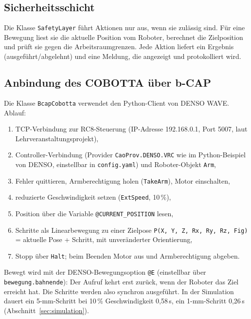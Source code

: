 \documentclass[11pt,a4paper]{article}
\newcommand{\datei}[1]{\texttt{#1}}
\begin{document}
\subsection{Sicherheitsschicht}

Die Klasse \texttt{SafetyLayer} führt Aktionen nur aus, wenn sie zulässig sind. Für eine
Bewegung liest sie die aktuelle Position vom Roboter, berechnet die Zielposition und prüft sie gegen
die Arbeitsraumgrenzen. Jede Aktion liefert ein Ergebnis (ausgeführt/abgelehnt) und eine Meldung,
die angezeigt und protokolliert wird.

\subsection{Anbindung des COBOTTA über b-CAP}

Die Klasse \texttt{BcapCobotta} verwendet den Python-Client von DENSO WAVE. Ablauf:
\begin{enumerate}
  \item TCP-Verbindung zur RC8-Steuerung (IP-Adresse 192.168.0.1, Port 5007, laut Lehrveranstaltungsprojekt),
  \item Controller-Verbindung (Provider \texttt{CaoProv.DENSO.VRC} wie im Python-Beispiel von DENSO,
        einstellbar in \datei{config.yaml}) und Roboter-Objekt \texttt{Arm},
  \item Fehler quittieren, Armberechtigung holen (\texttt{TakeArm}), Motor einschalten,
  \item reduzierte Geschwindigkeit setzen (\texttt{ExtSpeed}, 10\,\%),
  \item Position über die Variable \texttt{@CURRENT\_POSITION} lesen,
  \item Schritte als Linearbewegung zu einer Zielpose
        \texttt{P(X, Y, Z, Rx, Ry, Rz, Fig)} = aktuelle Pose + Schritt, mit unveränderter Orientierung,
  \item Stopp über \texttt{Halt}; beim Beenden Motor aus und Armberechtigung abgeben.
\end{enumerate}
Bewegt wird mit der DENSO-Bewegungsoption \texttt{@E} (einstellbar über \texttt{bewegung.bahnende}):
Der Aufruf kehrt erst zurück, wenn der Roboter das Ziel erreicht hat. Die Schritte werden also
synchron ausgeführt. In der Simulation dauert ein 5-mm-Schritt bei 10\,\% Geschwindigkeit 0,58\,s,
ein 1-mm-Schritt 0,26\,s (Abschnitt~\ref{sec:simulation}).
\end{document}
